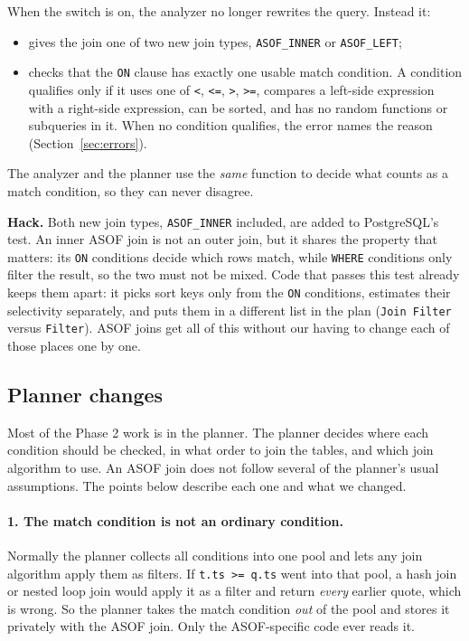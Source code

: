 \documentclass[11pt,a4paper]{article}
\newcommand{\code}[1]{\texttt{#1}}
\begin{document}
When the switch is on, the analyzer no longer rewrites the query. Instead it:

\begin{itemize}
  \item gives the join one of two new join types, \code{ASOF\_INNER} or
        \code{ASOF\_LEFT};
  \item checks that the \code{ON} clause has exactly one usable match condition. A
        condition qualifies only if it uses one of \code{<}, \code{<=}, \code{>},
        \code{>=}, compares a left-side expression with a right-side expression, can be
        sorted, and has no random functions or subqueries in it. When no condition
        qualifies, the error names the reason (Section~\ref{sec:errors}).
\end{itemize}

The analyzer and the planner use the \emph{same} function to decide what counts as a match
condition, so they can never disagree.

\textbf{Hack.} Both new join types, \code{ASOF\_INNER} included, are added to
PostgreSQL's  test. An inner ASOF join is not an outer join, but it
shares the property that matters: its \code{ON} conditions decide which rows match,
while \code{WHERE} conditions only filter the result, so the two must not be mixed.
Code that passes this test already keeps them apart: it picks sort keys only from the
\code{ON} conditions, estimates their selectivity separately, and puts them in a
different list in the plan (\code{Join Filter} versus \code{Filter}). ASOF joins get all
of this without our having to change each of those places one by one.

\subsection{Planner changes}

Most of the Phase 2 work is in the planner. The planner decides where each condition
should be checked, in what order to join the tables, and which join algorithm to use. An
ASOF join does not follow several of the planner's usual assumptions. The points below
describe each one and what we changed.

\paragraph{1. The match condition is not an ordinary condition.}
Normally the planner collects all conditions into one pool and lets any join algorithm
apply them as filters. If \code{t.ts >= q.ts} went into that pool, a hash join or nested
loop join would apply it as a filter and return \emph{every} earlier quote, which is
wrong. So the planner takes the match condition \emph{out} of the pool and stores it
privately with the ASOF join. Only the ASOF-specific code ever reads it.
\end{document}
